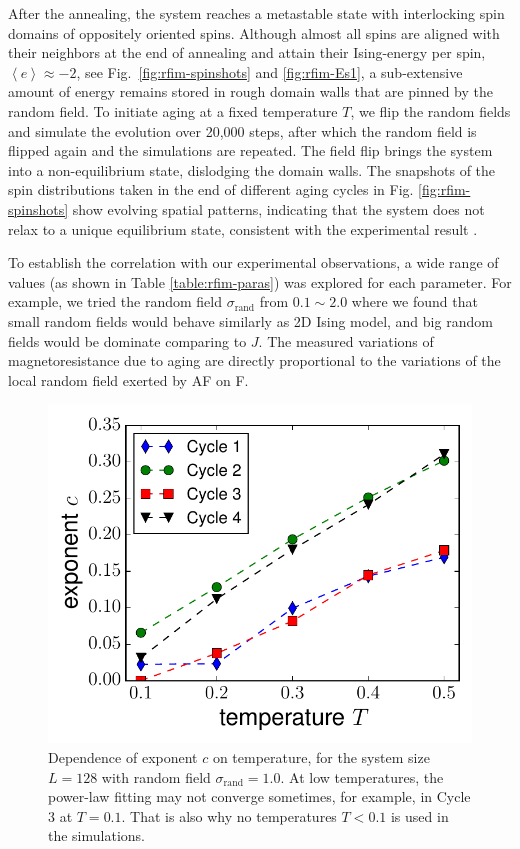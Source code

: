 After the annealing, the system reaches a metastable state with interlocking spin domains of oppositely oriented spins. Although almost all spins are aligned with their neighbors at the end of annealing and attain their Ising-energy per spin, $\left\langle e\right\rangle \approx-2$,
see Fig.~\ref{fig:rfim-spinshots} and \ref{fig:rfim-Es1}, a sub-extensive amount of energy remains stored in rough domain walls that are pinned by the random field. To initiate aging at a fixed temperature $T$, we flip the random fields and simulate the evolution over 20,000 steps, after which the random field is flipped again and the simulations are repeated. The field flip brings the system into a non-equilibrium state, dislodging the domain walls. The snapshots of the spin distributions taken in the end of different aging cycles in Fig. \ref{fig:rfim-spinshots} show evolving spatial patterns, indicating that the system does  not relax to a unique equilibrium state, consistent with the experimental result \cite{ma2016prb}.

To establish the correlation with our experimental observations, a wide range of values (as shown in Table \ref{table:rfim-paras}) was explored for each parameter. For example, we tried the random field $\sigma_{\text{rand}}$ from $0.1 \sim 2.0$ where we found that small random fields would behave similarly as 2D Ising model, and big random fields would be dominate comparing to $J$. The measured variations of magnetoresistance due to aging are directly proportional to the variations of the local random field exerted by AF on F.  

\begin{figure}
\centering \includegraphics[width=0.5\columnwidth]{Chapter-4/exponent_scale_4cycle_T03}
\protect\caption{Dependence of exponent $c$ on temperature, for the system size $L=128$ with random field $\sigma_{\text{rand}}=1.0$. At low temperatures, the power-law fitting may not converge sometimes, for example, in Cycle 3 at $T=0.1$. That is also why no temperatures $T<0.1$ is used in the simulations. }
\label{fig:rfim-expT} 
\end{figure}

